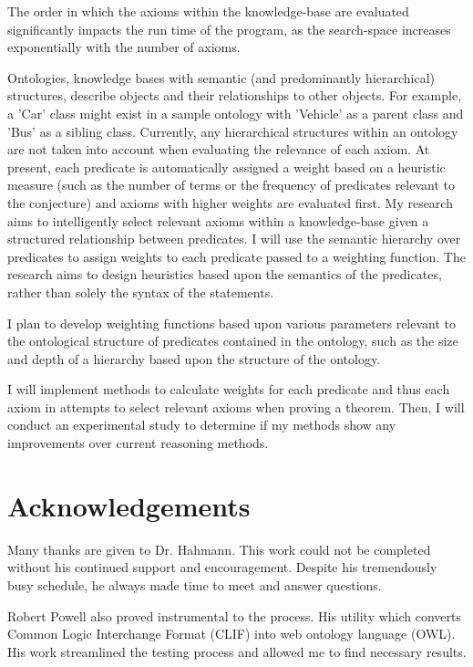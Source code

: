 \documentclass{article}
\begin{document}
The order in which the axioms within the knowledge-base are evaluated significantly impacts the run time of the program, as the search-space increases exponentially with the number of axioms. 

Ontologies, knowledge bases with semantic (and predominantly hierarchical) structures, describe objects and their relationships to other objects. For example, a 'Car' class might exist in a sample ontology with 'Vehicle' as a parent class and 'Bus' as a sibling class. Currently, any hierarchical structures within an ontology are not taken into account when evaluating the relevance of each axiom. At present, each predicate is automatically assigned a weight based on a heuristic measure (such as the number of terms or the frequency of predicates relevant to the conjecture) and axioms with higher weights are evaluated first. My research aims to intelligently select relevant axioms within a knowledge-base given a structured relationship between predicates. I will use the semantic hierarchy over predicates to assign weights to each predicate passed to a weighting function. The research aims to design heuristics based upon the semantics of the predicates, rather than solely the syntax of the statements. 

I plan to develop weighting functions based upon various parameters relevant to the ontological structure of predicates contained in the ontology, such as the size and depth of a hierarchy based upon the structure of the ontology. 

I will implement methods to calculate weights for each predicate and thus each axiom in attempts to select relevant axioms when proving a theorem. Then, I will conduct an experimental study to determine if my methods show any improvements over current reasoning methods.
	
	\setcounter{page}{3}
        \newpage
        \section*{Acknowledgements}
Many thanks are given to Dr. Hahmann. This work could not be completed without his continued support and encouragement. Despite his tremendously busy schedule, he always made time to meet and answer questions. 

Robert Powell also proved instrumental to the process. His utility which converts Common Logic Interchange Format (CLIF) into web ontology language (OWL). His work streamlined the testing process and allowed me to find necessary results. 
\end{document}
